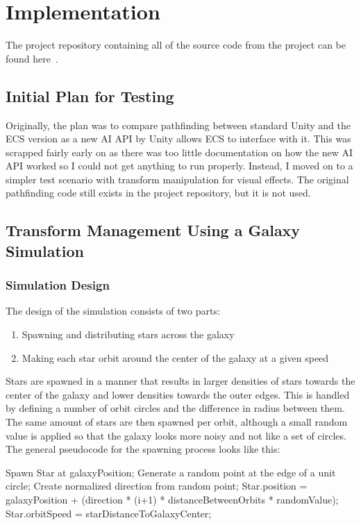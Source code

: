 \section{Implementation}
The project repository containing all of the source code from the project can be found here~\cite{projectrepo}.

\subsection{Initial Plan for Testing}
Originally, the plan was to compare pathfinding between standard Unity and the ECS version as a new AI API by Unity allows ECS to interface with it. This was scrapped fairly early on as there was too little documentation on how the new AI API worked so I could not get anything to run properly. Instead, I moved on to a simpler test scenario with transform manipulation for visual effects. The original pathfinding code still exists in the project repository, but it is not used.

\subsection{Transform Management Using a Galaxy Simulation}
\subsubsection{Simulation Design}
The design of the simulation consists of two parts: 
\begin{enumerate}
    \item Spawning and distributing stars across the galaxy
    \item Making each star orbit around the center of the galaxy at a given speed
\end{enumerate}
Stars are spawned in a manner that results in larger densities of stars towards the center of the galaxy and lower densities towards the outer edges. This is handled by defining a number of orbit circles and the difference in radius between them. The same amount of stars are then spawned per orbit, although a small random value is applied so that the galaxy looks more noisy and not like a set of circles. The general pseudocode for the spawning process looks like this:

\begin{algorithmic}
         \State Spawn Star at galaxyPosition;
         \State Generate a random point at the edge of a unit circle;
         \State Create normalized direction from random point;
         \State Star.position = galaxyPosition +
         \State (direction * (i+1) * distanceBetweenOrbits * randomValue);
         \State Star.orbitSpeed = starDistanceToGalaxyCenter;
    \EndFor
\EndFor
\end{algorithmic}

